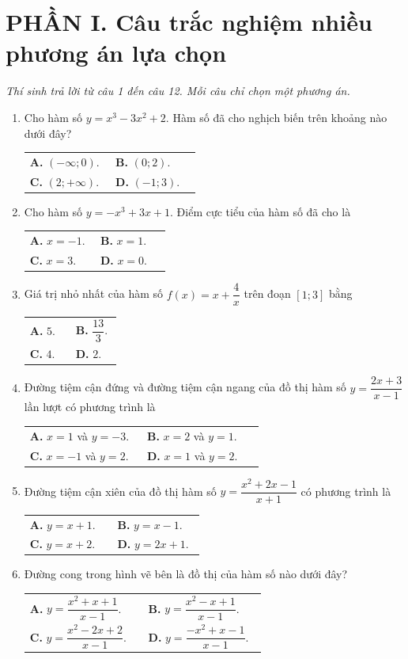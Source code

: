 \documentclass[12pt,a4paper]{article}
\makeatletter
\newcommand{\bonpa}[4]{\par\nobreak\smallskip\nobreak\noindent
\begin{tabular}{@{}p{0.47\linewidth}p{0.47\linewidth}@{}}
\textbf{A.} #1 & \textbf{B.} #2\\[8pt]
\textbf{C.} #3 & \textbf{D.} #4\end{tabular}}
\makeatother
\begin{document}
\section*{\large PHẦN I. Câu trắc nghiệm nhiều phương án lựa chọn}
\textit{Thí sinh trả lời từ câu 1 đến câu 12. Mỗi câu chỉ chọn một phương án.}
\begin{enumerate}
\item Cho hàm số $y=x^3-3x^2+2$. Hàm số đã cho nghịch biến trên khoảng nào dưới đây?
\bonpa{$(-\infty;0)$.}{$(0;2)$.}{$(2;+\infty)$.}{$(-1;3)$.}

\item Cho hàm số $y=-x^3+3x+1$. Điểm cực tiểu của hàm số đã cho là
\bonpa{$x=-1$.}{$x=1$.}{$x=3$.}{$x=0$.}

\item Giá trị nhỏ nhất của hàm số $f(x)=x+\dfrac{4}{x}$ trên đoạn $[1;3]$ bằng
\bonpa{$5$.}{$\dfrac{13}{3}$.}{$4$.}{$2$.}

\item Đường tiệm cận đứng và đường tiệm cận ngang của đồ thị hàm số $y=\dfrac{2x+3}{x-1}$ lần lượt có phương trình là
\bonpa{$x=1$ và $y=-3$.}{$x=2$ và $y=1$.}{$x=-1$ và $y=2$.}{$x=1$ và $y=2$.}

\item Đường tiệm cận xiên của đồ thị hàm số $y=\dfrac{x^2+2x-1}{x+1}$ có phương trình là
\bonpa{$y=x+1$.}{$y=x-1$.}{$y=x+2$.}{$y=2x+1$.}

\item Đường cong trong hình vẽ bên là đồ thị của hàm số nào dưới đây?
\par\nobreak\smallskip
\begin{minipage}[c]{0.62\linewidth}
\bonpa{$y=\dfrac{x^2+x+1}{x-1}$.}{$y=\dfrac{x^2-x+1}{x-1}$.}{$y=\dfrac{x^2-2x+2}{x-1}$.}{$y=\dfrac{-x^2+x-1}{x-1}$.}
\end{minipage}\hfill
\begin{minipage}[c]{0.36\linewidth}\centering
{}
\end{minipage}
\end{enumerate}
\end{document}
